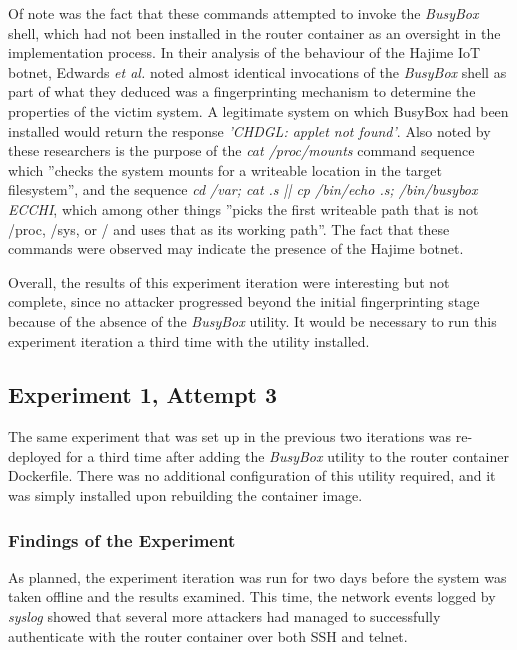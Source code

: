 Of note was the fact that these commands attempted to invoke the \textit{BusyBox} shell, which had not been installed in the router container as an oversight in the implementation process. In their analysis of the behaviour of the Hajime IoT botnet, Edwards \textit{et al.} noted almost identical invocations of the \textit{BusyBox} shell as part of what they deduced was a fingerprinting mechanism to determine the properties of the victim system. \cite{HajimeMysteriousBotnet} A legitimate system on which BusyBox had been installed would return the response \textit{'CHDGL: applet not found'}. Also noted by these researchers is the purpose of the \textit{cat /proc/mounts} command sequence which ''checks the system mounts for a writeable location in the target filesystem'', and the sequence \textit{cd /var; cat .s || cp /bin/echo .s; /bin/busybox ECCHI}, which among other things ''picks the first writeable path that is not /proc, /sys, or / and uses that as its working path''. The fact that these commands were observed may indicate the presence of the Hajime botnet.

Overall, the results of this experiment iteration were interesting but not complete, since no attacker progressed beyond the initial fingerprinting stage because of the absence of the \textit{BusyBox} utility. It would be necessary to run this experiment iteration a third time with the utility installed.

\subsection{Experiment 1, Attempt 3}
The same experiment that was set up in the previous two iterations was re-deployed for a third time after adding the \textit{BusyBox} utility to the router container Dockerfile. There was no additional configuration of this utility required, and it was simply installed upon rebuilding the container image.

\subsubsection{Findings of the Experiment}
As planned, the experiment iteration was run for two days before the system was taken offline and the results examined. This time, the network events logged by \textit{syslog} showed that several more attackers had managed to successfully authenticate with the router container over both SSH and telnet.

